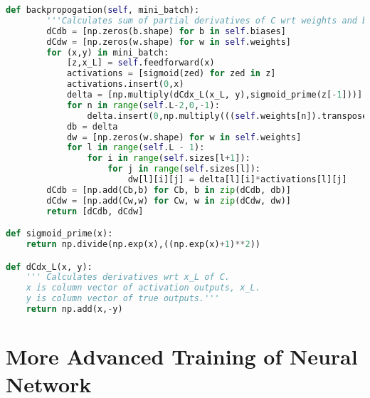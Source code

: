 \documentclass[10pt]{article}
\begin{document}
\begin{lstlisting}[language=Python, breaklines, basicstyle=\small]
	def backpropogation(self, mini_batch):
		'''Calculates sum of partial derivatives of C wrt weights and biases for a given minibatch'''
		dCdb = [np.zeros(b.shape) for b in self.biases]
		dCdw = [np.zeros(w.shape) for w in self.weights]
		for (x,y) in mini_batch:
			[z,x_L] = self.feedforward(x)
			activations = [sigmoid(zed) for zed in z]
			activations.insert(0,x)
			delta = [np.multiply(dCdx_L(x_L, y),sigmoid_prime(z[-1]))]
			for n in range(self.L-2,0,-1):
				delta.insert(0,np.multiply(((self.weights[n]).transpose()).dot(delta[0]),sigmoid_prime(z[n-1])))
			db = delta
			dw = [np.zeros(w.shape) for w in self.weights]
			for l in range(self.L - 1):
				for i in range(self.sizes[l+1]):
					for j in range(self.sizes[l]):
						dw[l][i][j] = delta[l][i]*activations[l][j]
		dCdb = [np.add(Cb,b) for Cb, b in zip(dCdb, db)]
		dCdw = [np.add(Cw,w) for Cw, w in zip(dCdw, dw)]
		return [dCdb, dCdw]

def sigmoid_prime(x):
	return np.divide(np.exp(x),((np.exp(x)+1)**2))

def dCdx_L(x, y):
	''' Calculates derivatives wrt x_L of C.
	x is column vector of activation outputs, x_L.
	y is column vector of true outputs.'''
	return np.add(x,-y)
\end{lstlisting}

\section{More Advanced Training of Neural Network}
\end{document}
